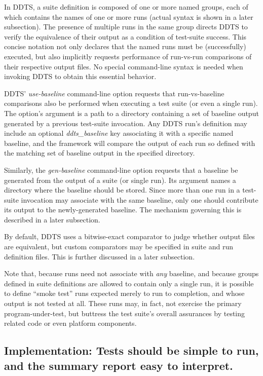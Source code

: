 \documentclass[conference]{IEEEtran}
\begin{document}
In DDTS, a suite definition is composed of one or more named groups, each of which contains the names of one or more runs (actual syntax is shown in a later subsection). The presence of multiple runs in the same group directs DDTS to verify the equivalence of their output as a condition of test-suite success. This concise notation not only declares that the named runs must be (successfully) executed, but also implicitly requests performance of run-vs-run comparisons of their respective output files. No special command-line syntax is needed when invoking DDTS to obtain this essential behavior.

DDTS' \emph{use-baseline} command-line option requests that run-vs-baseline comparisons also be performed when executing a test suite (or even a single run). The option's argument is a path to a directory containing a set of baseline output generated by a previous test-suite invocation. Any DDTS run's definition may include an optional \emph{ddts_baseline} key associating it with a specific named baseline, and the framework will compare the output of each run so defined with the matching set of baseline output in the specified directory.

Similarly, the \emph{gen-baseline} command-line option requests that a baseline be generated from the output of a suite (or single run). Its argument names a directory where the baseline should be stored. Since more than one run in a test-suite invocation may associate with the same baseline, only one should contribute its output to the newly-generated baseline. The mechanism governing this is described in a later subsection.

By default, DDTS uses a bitwise-exact comparator to judge whether output files are equivalent, but custom comparators may be specified in suite and run definition files. This is further discussed in a later subsection.

Note that, because runs need not associate with \emph{any} baseline, and because groups defined in suite definitions are allowed to contain only a single run, it is possible to define ``smoke test'' runs expected merely to run to completion, and whose output is not tested at all. These runs may, in fact, not exercise the primary program-under-test, but buttress the test suite's overall assurances by testing related code or even platform components.

\subsection{Implementation: Tests should be simple to run, and the summary report easy to interpret.}
\end{document}
